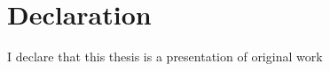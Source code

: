 \chapter*{Declaration}
\thispagestyle{plain}

I declare that this thesis is a presentation of original work  
